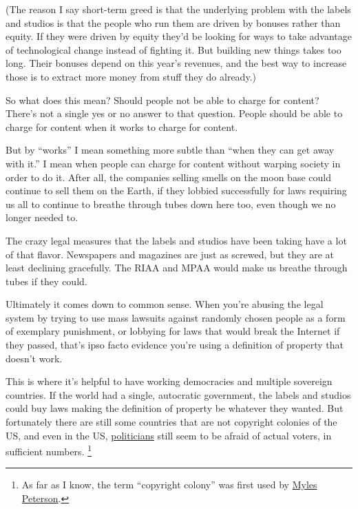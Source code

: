 (The reason I say short-term greed is that the underlying problem with
the labels and studios is that the people who run them are driven by
bonuses rather than equity. If they were driven by equity they'd be
looking for ways to take advantage of technological change instead of
fighting it. But building new things takes too long. Their bonuses
depend on this year's revenues, and the best way to increase those is to
extract more money from stuff they do already.)

So what does this mean? Should people not be able to charge for content?
There's not a single yes or no answer to that question. People should be
able to charge for content when it works to charge for content.

But by ``works'' I mean something more subtle than ``when they can get
away with it.'' I mean when people can charge for content without
warping society in order to do it. After all, the companies selling
smells on the moon base could continue to sell them on the Earth, if
they lobbied successfully for laws requiring us all to continue to
breathe through tubes down here too, even though we no longer needed to.

The crazy legal measures that the labels and studios have been taking
have a lot of that flavor. Newspapers and magazines are just as screwed,
but they are at least declining gracefully. The RIAA and MPAA would make
us breathe through tubes if they could.

Ultimately it comes down to common sense. When you're abusing the legal
system by trying to use mass lawsuits against randomly chosen people as
a form of exemplary punishment, or lobbying for laws that would break
the Internet if they passed, that's ipso facto evidence you're using a
definition of property that doesn't work.

This is where it's helpful to have working democracies and multiple
sovereign countries. If the world had a single, autocratic government,
the labels and studios could buy laws making the definition of property
be whatever they wanted. But fortunately there are still some countries
that are not copyright colonies of the US, and even in the US,
\href{http://tctechcrunch2011.files.wordpress.com/2012/01/congress-on-sopa-done.png}{politicians}
still seem to be afraid of actual voters, in sufficient numbers.
\footnote{As far as I know, the term ``copyright colony'' was first used
by
\href{http://torrentfreak.com/australia-us-copyright-colony-or-just-a-good-friend-120121/}{Myles
Peterson}.}

